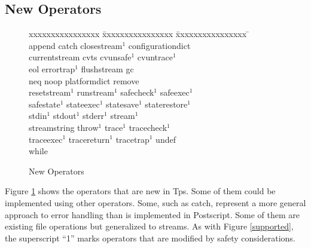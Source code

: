 \subsection{New Operators}
\begin{figure}[b]\centering
\begin{tabbing}
xxxxxxxxxxxxxxxx \= xxxxxxxxxxxxxxxx \= xxxxxxxxxxxxxxxx \= \kill \\
append \> catch \> closestream$^{1}$ \> configurationdict \\
currentstream \> cvts \> cvunsafe$^{1}$ \> cvuntrace$^{1}$ \\
eol \> errortrap$^{1}$ \> flushstream \> gc \\
neq \> noop \> platformdict \> remove \\
resetstream$^{1}$ \> runstream$^{1}$ \> safecheck$^{1}$ \> safeexec$^{1}$ \\
safestate$^{1}$ \> stateexec$^{1}$ \> statesave$^{1}$ \> staterestore$^{1}$ \\
stdin$^{1}$ \> stdout$^{1}$ \> stderr$^{1}$ \> stream$^{1}$ \\
streamstring \> throw$^{1}$ \> trace$^{1}$ \> tracecheck$^{1}$ \\
traceexec$^{1}$ \> tracereturn$^{1}$ \> tracetrap$^{1}$ \> undef \\
while \\
\end{tabbing}
\caption{New Operators}
\label{newoperators}
\end{figure}
Figure \ref{newoperators} shows the operators that are new in Tps.
Some of them could
be implemented using other operators.  Some, such as catch,
represent a more general approach to error handling than is implemented
in Postscript.  Some of them are existing file
operations but generalized to streams.
As with Figure \ref{supported},
the superscript ``1'' marks operators that are modified by safety
considerations.
